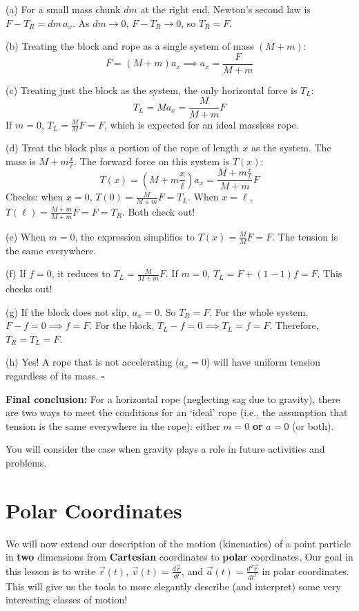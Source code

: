 \documentclass[11pt, letterpaper, openany]{book}
\newenvironment{solution}[1][Solution]{%
  \tcolorbox[blanker, breakable, left=1em,
    before skip=1em, after skip=1em,
    borderline west={2pt}{0pt}{PhysTeal},
    colback=PhysCream,
    before upper={\textcolor{PhysTeal}{\sffamily\bfseries #1.}\space}
  ]%
}{%
  \hfill\textcolor{PhysTeal}{\ensuremath{\square}}\endtcolorbox%
}
\begin{document}
\begin{solution}
(a) For a small mass chunk $dm$ at the right end, Newton's second law is $F - T_R = dm\, a_x$. As $dm \to 0$, $F - T_R \to 0$, so $T_R = F$.

(b) Treating the block and rope as a single system of mass $(M+m)$:
\[ F = (M+m)a_x \implies a_x = \frac{F}{M+m} \]

(c) Treating just the block as the system, the only horizontal force is $T_L$:
\[ T_L = M a_x = \frac{M}{M+m}F \]
If $m=0$, $T_L = \frac{M}{M}F = F$, which is expected for an ideal massless rope.

(d) Treat the block plus a portion of the rope of length $x$ as the system. The mass is $M + m \frac{x}{\ell}$. The forward force on this system is $T(x)$:
\[ T(x) = \left(M + m\frac{x}{\ell}\right) a_x = \frac{M + m \frac{x}{\ell}}{M+m} F \]
Checks: when $x=0$, $T(0) = \frac{M}{M+m}F = T_L$. When $x=\ell$, $T(\ell) = \frac{M+m}{M+m}F = F = T_R$. Both check out!

(e) When $m=0$, the expression simplifies to $T(x) = \frac{M}{M}F = F$. The tension is the same everywhere.

(f) If $f=0$, it reduces to $T_L = \frac{M}{M+m}F$. If $m=0$, $T_L = F + (1 - 1)f = F$. This checks out!

(g) If the block does not slip, $a_x = 0$. So $T_R = F$. For the whole system, $F - f = 0 \implies f = F$. For the block, $T_L - f = 0 \implies T_L = f = F$. Therefore, $T_R = T_L = F$.

(h) Yes! A rope that is not accelerating ($a_x = 0$) will have uniform tension regardless of its mass.
\end{solution}

\textbf{Final conclusion:} For a horizontal rope (neglecting sag due to gravity), there are two ways to meet the conditions for an `ideal' rope (i.e., the assumption that tension is the same everywhere in the rope): either $m=0$ \textbf{or} $a=0$ (or both).

You will consider the case when gravity plays a role in future activities and problems.

\section{Polar Coordinates}

We will now extend our description of the motion (kinematics) of a point particle in \textbf{two} dimensions from \textbf{Cartesian} coordinates to \textbf{polar} coordinates. Our goal in this lesson is to write $\vec{r}(t)$, $\vec{v}(t) = \frac{d\vec{r}}{dt}$, and $\vec{a}(t) = \frac{d^2\vec{r}}{dt^2}$ in polar coordinates. This will give us the tools to more elegantly describe (and interpret) some very interesting classes of motion!
\end{document}
